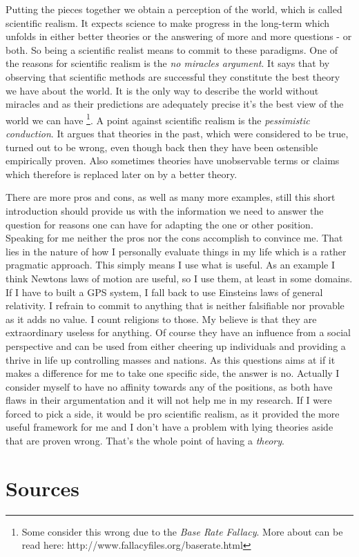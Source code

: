 \documentclass[11pt]{scrartcl}
\begin{document}
Putting the pieces together we obtain a perception of the world, which is called scientific realism. It expects science to make progress in the long-term which unfolds in either better theories or the answering of more and more questions - or both. So being a scientific realist means to commit to these paradigms. One of the reasons for scientific realism is the \textit{no miracles argument}. It says that by observing that scientific methods are successful they constitute the best theory we have about the world. It is the only way to describe the world without miracles and as their predictions are adequately precise it's the best view of the world we can have \footnote{Some consider this wrong due to the \textit{Base Rate Fallacy}. More about can be read here: http://www.fallacyfiles.org/baserate.html}. A point against scientific realism is the \textit{pessimistic conduction}. It argues that theories in the past, which were considered to be true, turned out to be wrong, even though back then they have been ostensible empirically proven. Also sometimes theories have unobservable terms or claims which therefore is replaced later on by a better theory.

There are more pros and cons, as well as many more examples, still this short introduction should provide us with the information we need to answer the question for reasons one can have for adapting the one or other position. Speaking for me neither the pros nor the cons accomplish to convince me. That lies in the nature of how I personally evaluate things in my life which is a rather pragmatic approach. This simply means I use what is useful. As an example I think Newtons laws of motion are useful, so I use them, at least in some domains. If I have to built a GPS system, I fall back to use Einsteins laws of general relativity. I refrain to commit to anything that is neither falsifiable nor provable as it adds no value. I count religions to those. My believe is that they are extraordinary useless for anything. Of course they have an influence from a social perspective and can be used from either cheering up individuals and providing a thrive in life up controlling masses and nations. As this questions aims at if it makes a difference for me to take one specific side, the answer is no. Actually I consider myself to have no affinity towards any of the positions, as both have flaws in their argumentation and it will not help me in my research. If I were forced to pick a side, it would be pro scientific realism, as it provided the more useful framework for me and I don't have a problem with lying theories aside that are proven wrong. That's the whole point of having a \textit{theory}.



\section{Sources}



\end{document}
